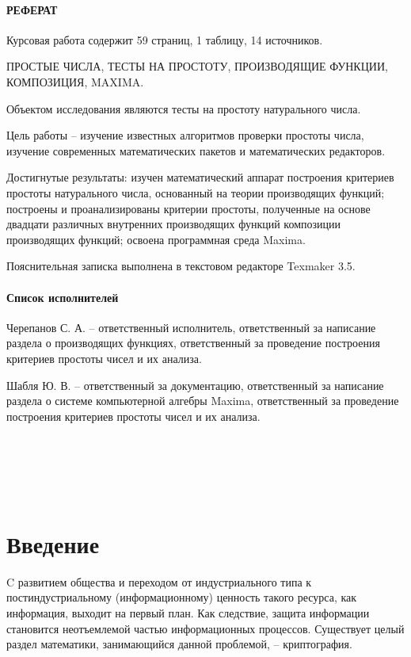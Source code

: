 \documentclass[
russian,
cp1251,
14pt,
simple
]{eskdtext}
\theoremstyle{definition}
\begin{document}
\newpage
{}
\paragraph{\hfill РЕФЕРАТ \hfill}
Курсовая работа содержит  59 страниц,  1 таблицу,  14 источников.

ПРОСТЫЕ ЧИСЛА, ТЕСТЫ НА ПРОСТОТУ, ПРОИЗВОДЯЩИЕ ФУНКЦИИ, КОМПОЗИЦИЯ, MAXIMA.

Объектом исследования являются тесты на простоту натурального числа.

Цель работы -- изучение известных алгоритмов проверки простоты числа, изучение современных математических пакетов и математических редакторов.

Достигнутые результаты: изучен математический аппарат построения критериев простоты натурального числа, основанный на теории производящих функций; построены  и проанализированы критерии простоты, полученные на основе двадцати различных внутренних производящих функций композиции производящих функций; освоена программная среда Maxima.

Пояснительная записка выполнена в текстовом редакторе Texmaker 3.5.

\newpage
{}
\paragraph{\hfill Список исполнителей \hfill}

Черепанов С. А. -- ответственный исполнитель, ответственный за написание раздела о производящих функциях, ответственный за проведение построения критериев простоты чисел и их анализа.

Шабля Ю. В. -- ответственный за документацию, ответственный за написание раздела о системе компьютерной алгебры Maxima, ответственный за проведение построения критериев простоты чисел и их анализа.

\newpage
{}
\ \\ 
\newpage
{}
\ \\ 
\newpage
{}
\ \\ 
\newpage
{}
\ \\ 

\newpage
{}
\renewcommand\contentsname{\hfill Содержание \hfill}
\tableofcontents

\newpage
{}
\section{Введение}
C развитием общества и переходом от индустриального типа к постиндустриальному (информационному) ценность такого ресурса, как информация, выходит на первый план. Как следствие, защита информации становится неотъемлемой частью информационных процессов. Существует целый раздел математики, занимающийся данной проблемой, -- криптография.
\end{document}

